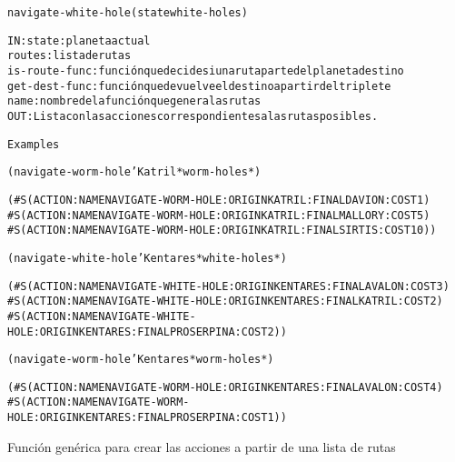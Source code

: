 \begin{aibox}{\function}
\begin{alltt}
navigate-white-hole (state white-holes)


IN:    state: planeta actual
       routes: lista de rutas
        is-route-func: función que decide si una ruta parte del planeta destino
       get-dest-func: función que devuelve el destino a partir del triplete
       name: nombre de la función que genera las rutas
OUT:    Lista con las acciones correspondientes a las rutas posibles.

\end{alltt}
\end{aibox}

\begin{aibox}{\examples}
\begin{alltt}
Examples

(navigate-worm-hole 'Katril *worm-holes*)

(\#S(ACTION :NAME NAVIGATE-WORM-HOLE :ORIGIN KATRIL :FINAL DAVION :COST 1)
 \#S(ACTION :NAME NAVIGATE-WORM-HOLE :ORIGIN KATRIL :FINAL MALLORY :COST 5)
 \#S(ACTION :NAME NAVIGATE-WORM-HOLE :ORIGIN KATRIL :FINAL SIRTIS :COST 10))

(navigate-white-hole 'Kentares *white-holes*)

(\#S(ACTION :NAME NAVIGATE-WHITE-HOLE :ORIGIN KENTARES :FINAL AVALON :COST 3)
 \#S(ACTION :NAME NAVIGATE-WHITE-HOLE :ORIGIN KENTARES :FINAL KATRIL :COST 2)
 \#S(ACTION :NAME NAVIGATE-WHITE-HOLE :ORIGIN KENTARES :FINAL PROSERPINA :COST 2))

(navigate-worm-hole 'Kentares *worm-holes*)

(\#S(ACTION :NAME NAVIGATE-WORM-HOLE :ORIGIN KENTARES :FINAL AVALON :COST 4)
 \#S(ACTION :NAME NAVIGATE-WORM-HOLE :ORIGIN KENTARES :FINAL PROSERPINA :COST 1))


\end{alltt}
\end{aibox}

\begin{aibox}{\comments}
Función genérica para crear las acciones a partir de una lista de rutas

\end{aibox}


